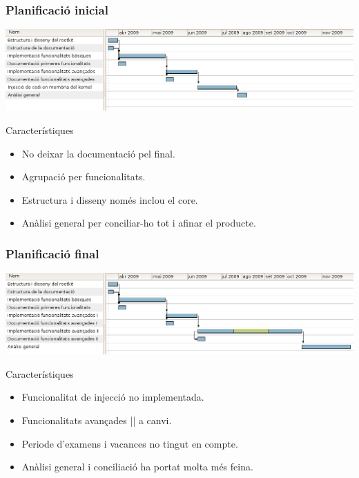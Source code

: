 \documentclass{beamer}
\begin{document}
\begin{frame}
	\frametitle{Planificació inicial}
	\hspace*{-0.38in}
	\includegraphics[scale=0.35,keepaspectratio]{gantt1.png} 
	\begin{block}{Característiques}
		\begin{itemize}
			\item No deixar la documentació pel final.
			\item Agrupació per funcionalitats.
			\item Estructura i disseny només inclou el core.
			\item Anàlisi general per conciliar-ho tot i afinar el producte.
		\end{itemize}
	\end{block}
\end{frame}

\begin{frame}
	\frametitle{Planificació final}
	\hspace*{-0.38in}
	\includegraphics[scale=0.35,keepaspectratio]{gantt2.png} 
	\begin{block}{Característiques}
		\begin{itemize}
			\item Funcionalitat de injecció no implementada.
			\item Funcionalitats avançades || a canvi.
			\item Periode d'examens i vacances no tingut en compte.
			\item Anàlisi general i conciliació ha portat molta més feina.
		\end{itemize}
	\end{block}
\end{frame}
\end{document}

